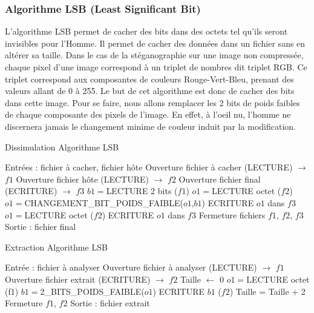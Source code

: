 \documentclass[11pt]{article}
\begin{document}
\subsubsection{Algorithme LSB (Least Significant Bit)}

L'algorithme LSB permet de cacher des bits dans des octets tel qu'ils seront
invisibles pour l'Homme. Il permet de cacher des données dans un fichier sans en
altérer sa taille. Dans le cas de la stéganographie sur une image non compressée,
chaque pixel d'une image correspond à un triplet de nombres dit triplet RGB. Ce
triplet correspond aux composantes de couleurs Rouge-Vert-Bleu, prenant des
valeurs allant de 0 à 255. Le but de cet algorithme est donc de cacher des bits 
dans cette image. Pour se faire, nous allons remplacer les 2 bits de poids 
faibles de chaque composante des pixels de l'image. En effet, à l'oeil nu, 
l'homme ne discernera jamais le changement minime de couleur induit par la 
modification. 

\begin{minipage}{.5\textwidth}
\begin{algorithm}[H]
\caption{Dissimulation Algorithme LSB}
\begin{algorithmic}
\color{green}
\STATE \footnotesize Entrées : fichier à cacher, fichier hôte
\color{black}
\STATE  Ouverture fichier à cacher (LECTURE) $\rightarrow$ $f1$
\STATE Ouverture fichier hôte (LECTURE) $\rightarrow$ $f2$
\STATE Ouverture fichier final (ECRITURE) $\rightarrow$ $f3$
\STATE $b1 = $LECTURE 2 bits ($f1$)
\STATE $o1 = $LECTURE octet ($f2$)
\STATE $o1 = $CHANGEMENT\_BIT\_POIDS\_FAIBLE($o1$,$b1$)
\STATE ECRITURE $o1$ dans $f3$
\ENDWHILE
{}
\STATE $o1 =$LECTURE octet ($f2$)
\STATE ECRITURE $o1$ dans $f3$
\ENDWHILE
\STATE Fermeture fichiers $f1$, $f2$, $f3$
\color{green}
\STATE Sortie : fichier final
\color{black}
\end{algorithmic}
\end{algorithm}
\normalsize
\end{minipage}
\begin{minipage}{.5\textwidth}
\begin{algorithm}[H]
\caption{Extraction Algorithme LSB}
\begin{algorithmic}
\color{green}
\STATE \footnotesize Entrée : fichier à analyser
\color{black}
\STATE Ouverture fichier à analyser (LECTURE) $\rightarrow$ $f1$
\STATE Ouverture fichier extrait (ECRITURE) $\rightarrow$ $f2$
\STATE Taille $\leftarrow$ 0
\STATE $o1 = $LECTURE octet (f1)
\STATE $b1 = $2\_BITS\_POIDS\_FAIBLE($o1$)
\STATE ECRITURE $b1$ ($f2$)
\STATE Taille = Taille + 2
\ENDWHILE
\STATE Fermeture $f1$, $f2$
\color{green}
\STATE Sortie : fichier extrait
\color{black}
\end{algorithmic}
\end{algorithm}
\normalsize
\end{minipage}
\end{document}
